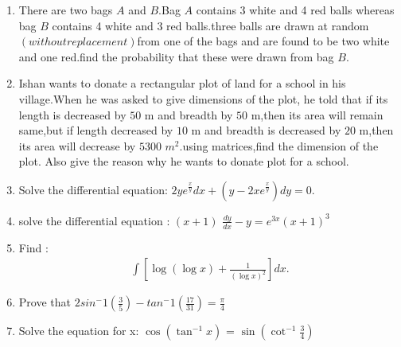 \documentclass[12pt,-letter paper]{article}
\providecommand{\brak}[1]{\ensuremath{\left(#1\right)}}
\begin{document}
\begin{enumerate}
\item 
	There are two bags $A$ and $B$.Bag $A$ contains 3 white and 4 red balls whereas bag $B$ contains 4 white and 3 red balls.three balls are drawn at random $\brak{without replacement}$from one of the bags and are found to  be two white and one red.find the probability that these were drawn from bag $B$.

\item  
	Ishan wants to donate a rectangular plot of land for a school in his village.When he was asked to give dimensions of the plot, he told that if its length is decreased by $50$ m and breadth by $50$ m,then its area will remain same,but if length decreased by $10$ m and breadth is decreased by $20$ m,then its area will decrease by $5300$ $m^2$.using matrices,find the dimension of the plot. Also give the reason why he wants to donate plot for a school.

\item 
	Solve the differential equation: $2y e^{\frac{x}{y}} dx + \brak{y - 2x e^{\frac{x}{y}}} dy = 0$.
\item
	solve the differential equation : $\brak{x+1}$ $\frac{dy}{dx}-y=e^{3x}(x+1)^3$

\item 
	Find : \begin{align*}\int[\log(\log{x})+\frac{1}{(\log{x})^2}]dx.\end{align*}

\item 
       Prove that $2sin^-1 (\frac{3}{5})-tan^-1(\frac{17}{31})=\frac{    \pi}{4}$

\item
	Solve the equation for x: $\cos{\brak{\tan^{-1}x}}$ = $\sin\brak{{\cot^{-1}\frac{3}{4}}}$


\end{enumerate}
\end{document}
